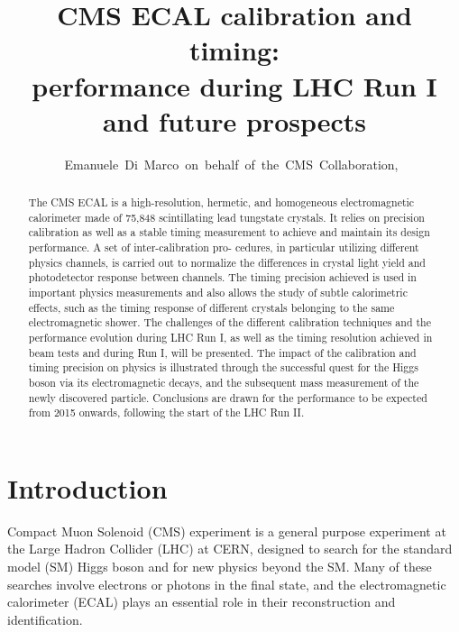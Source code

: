 \documentclass[journal]{IEEEtran}
\begin{document}
\title{CMS ECAL calibration and timing: \\ performance during LHC Run I and future prospects}

\author{Emanuele~Di~Marco~on~behalf~of~the~CMS~Collaboration,~}

\maketitle


\begin{abstract}
The CMS ECAL is a high-resolution, hermetic, and homogeneous electromagnetic calorimeter made of 75,848 scintillating lead tungstate crystals. It relies on precision calibration as well as a stable timing measurement to achieve and maintain its design performance. A set of inter-calibration pro- cedures, in particular utilizing different physics channels, is carried out to normalize the differences in crystal light yield and photodetector response between channels. The timing precision achieved is used in important physics measurements and also allows the study of subtle calorimetric effects, such as the timing response of different crystals belonging to the same electromagnetic shower. The challenges of the different calibration techniques and the performance evolution during LHC Run I, as well as the timing resolution achieved in beam tests and during Run I, will be presented. The impact of the calibration and timing precision on physics is illustrated through the successful quest for the Higgs boson via its electromagnetic decays, and the subsequent mass measurement of the newly discovered particle. Conclusions are drawn for the performance to be expected from 2015 onwards, following the start of the LHC Run II.
\end{abstract}

\begin{IEEEkeywords}
\end{IEEEkeywords}

\IEEEpeerreviewmaketitle



\section{Introduction}
\label{sec:introduction}
 Compact Muon Solenoid (CMS) experiment \cite{Chatrchyan:2008aa} is a general purpose experiment at the Large Hadron Collider (LHC) at CERN, designed to search for the standard model (SM) Higgs boson and for new physics beyond the SM. Many of these searches involve electrons or photons in the final state, and the electromagnetic calorimeter (ECAL) plays an essential role in their reconstruction and identification.
\end{document}

